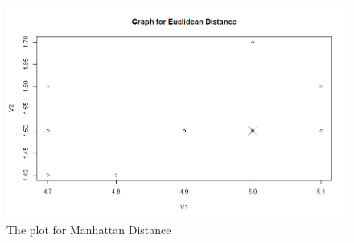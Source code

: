 \documentclass[fontsize=10pt]{scrartcl}
\begin{document}
\begin{enumerate}
\begin{enumerate}
\begin{verbatim}
\end{verbatim}
			\begin{figure}[H]
				\begin{center}
					\includegraphics[scale=.5]{resources/euclidean.png}
					\caption{The plot for Manhattan Distance}
				\end{center}
			\end{figure}


			\end{enumerate}
	\end{enumerate}
\end{document}
